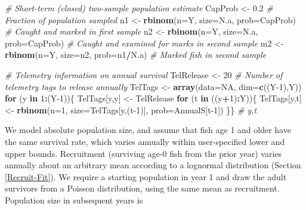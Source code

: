 \documentclass[
]{krantz}
\makeatletter
\newenvironment{Shaded}{\begin{snugshade}}{\end{snugshade}}
\newcommand{\AttributeTok}[1]{\textcolor[rgb]{0.27,0.27,0.27}{#1}}
\newcommand{\CommentTok}[1]{\textcolor[rgb]{0.37,0.37,0.37}{\textit{#1}}}
\newcommand{\ConstantTok}[1]{\textcolor[rgb]{0.37,0.37,0.37}{#1}}
\newcommand{\ControlFlowTok}[1]{\textcolor[rgb]{0.27,0.27,0.27}{\textbf{#1}}}
\newcommand{\DecValTok}[1]{\textcolor[rgb]{0.06,0.06,0.06}{#1}}
\newcommand{\FloatTok}[1]{\textcolor[rgb]{0.06,0.06,0.06}{#1}}
\newcommand{\FunctionTok}[1]{\textcolor[rgb]{0.27,0.27,0.27}{\textbf{#1}}}
\newcommand{\NormalTok}[1]{#1}
\newcommand{\OtherTok}[1]{\textcolor[rgb]{0.37,0.37,0.37}{#1}}
\newcommand{\SpecialCharTok}[1]{\textcolor[rgb]{0.43,0.43,0.43}{\textbf{#1}}}
\newenvironment{kframe}{%
\medskip{}
\setlength{\fboxsep}{.8em}
 \def\at@end@of@kframe{}%
 \ifinner\ifhmode%
  \def\at@end@of@kframe{\end{minipage}}%
  \begin{minipage}{\columnwidth}%
 \fi\fi%
 \def\FrameCommand##1{\hskip\@totalleftmargin \hskip-\fboxsep
 \colorbox{shadecolor}{##1}\hskip-\fboxsep
     \hskip-\linewidth \hskip-\@totalleftmargin \hskip\columnwidth}%
 \MakeFramed {\advance\hsize-\width
   \@totalleftmargin\z@ \linewidth\hsize
   \@setminipage}}%
 {\par\unskip\endMakeFramed%
 \at@end@of@kframe}
\renewenvironment{Shaded}{\begin{kframe}}{\end{kframe}}
\makeatother
\begin{document}
\begin{Shaded}
\begin{Highlighting}[]
\CommentTok{\# Short{-}term (closed) two{-}sample population estimate}
\NormalTok{CapProb }\OtherTok{\textless{}{-}} \FloatTok{0.2} \CommentTok{\# Fraction of population sampled}
\NormalTok{n1 }\OtherTok{\textless{}{-}} \FunctionTok{rbinom}\NormalTok{(}\AttributeTok{n=}\NormalTok{Y, }\AttributeTok{size=}\NormalTok{N.a, }\AttributeTok{prob=}\NormalTok{CapProb) }\CommentTok{\# Caught and marked in first sample}
\NormalTok{n2 }\OtherTok{\textless{}{-}} \FunctionTok{rbinom}\NormalTok{(}\AttributeTok{n=}\NormalTok{Y, }\AttributeTok{size=}\NormalTok{N.a, }\AttributeTok{prob=}\NormalTok{CapProb) }
\CommentTok{\# Caught and examined for marks in second sample}
\NormalTok{m2 }\OtherTok{\textless{}{-}} \FunctionTok{rbinom}\NormalTok{(}\AttributeTok{n=}\NormalTok{Y, }\AttributeTok{size=}\NormalTok{n2, }\AttributeTok{prob=}\NormalTok{n1}\SpecialCharTok{/}\NormalTok{N.a) }\CommentTok{\# Marked fish in second sample}

\CommentTok{\# Telemetry information on annual survival}
\NormalTok{TelRelease }\OtherTok{\textless{}{-}} \DecValTok{20} \CommentTok{\# Number of telemetry tags to release annually}
\NormalTok{TelTags }\OtherTok{\textless{}{-}} \FunctionTok{array}\NormalTok{(}\AttributeTok{data=}\ConstantTok{NA}\NormalTok{, }\AttributeTok{dim=}\FunctionTok{c}\NormalTok{((Y}\DecValTok{{-}1}\NormalTok{),Y))}
\ControlFlowTok{for}\NormalTok{ (y }\ControlFlowTok{in} \DecValTok{1}\SpecialCharTok{:}\NormalTok{(Y}\DecValTok{{-}1}\NormalTok{))\{}
\NormalTok{  TelTags[y,y] }\OtherTok{\textless{}{-}}\NormalTok{ TelRelease}
  \ControlFlowTok{for}\NormalTok{ (t }\ControlFlowTok{in}\NormalTok{ ((y}\SpecialCharTok{+}\DecValTok{1}\NormalTok{)}\SpecialCharTok{:}\NormalTok{Y))\{}
\NormalTok{    TelTags[y,t] }\OtherTok{\textless{}{-}} \FunctionTok{rbinom}\NormalTok{(}\AttributeTok{n=}\DecValTok{1}\NormalTok{, }\AttributeTok{size=}\NormalTok{TelTags[y,(t}\DecValTok{{-}1}\NormalTok{)], }\AttributeTok{prob=}\NormalTok{AnnualS[t}\DecValTok{{-}1}\NormalTok{])}
\NormalTok{  \}\} }\CommentTok{\# y,t}
\end{Highlighting}
\end{Shaded}

We model absolute population size, and assume that fish age 1 and older have the same survival rate, which varies annually within user-specified lower and upper bounds. Recruitment (surviving age-0 fish from the prior year) varies annually about an arbitrary mean according to a lognormal distribution (Section \ref{Recruit-Fit}). We require a starting population in year 1 and draw the adult survivors from a Poisson distribution, using the same mean as recruitment. Population size in subsequent years is
\end{document}

